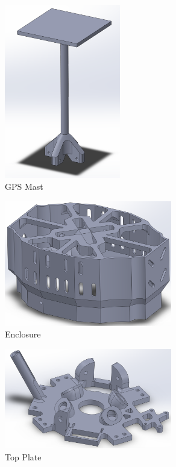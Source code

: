 \documentclass[12pt, titlepage]{article}
\begin{document}
\begin{figure}[h!]
  \begin{center} 
  \caption{GPS Mast}
  \label{GPS Mast}
        \includegraphics[width=0.45\textwidth]{CAD_Mast.png}
  \end{center}
\end{figure}

\begin{figure}[h!]
  \begin{center} 
  \caption{Enclosure}
  \label{Enclosure}
        \includegraphics[width=0.65\textwidth]{CAD_Enclosure.png}
  \end{center}
\end{figure}

\begin{figure}[h!]
  \begin{center} 
  \caption{Top Plate}
  \label{Top Plate}
        \includegraphics[width=0.65\textwidth]{CAD_TopPlate.png}
  \end{center}
\end{figure}
\end{document}
